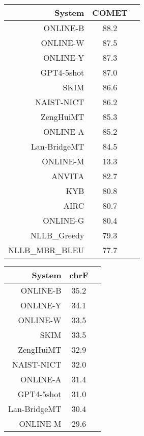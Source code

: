 \documentclass[11pt]{article}
\begin{document}
\begin{table}  
\scriptsize
\begin{subtable}[t]{0.33\textwidth}
\begin{tabular}{rcc}
\toprule 
System  & COMET \\ 
\midrule 
\rowcolor{ashgrey} ONLINE-B  & 88.2 \\ 
\rowcolor{ashgrey} ONLINE-W  & 87.5 \\ 
\rowcolor{ashgrey} ONLINE-Y & 87.3 \\ 
\rowcolor{ashgrey} GPT4-5shot  & 87.0 \\ 
SKIM & 86.6 \\ 
NAIST-NICT  & 86.2 \\ 
\rowcolor{ashgrey} ZengHuiMT  & 85.3 \\ 
\rowcolor{ashgrey} ONLINE-A  & 85.2 \\ 
\rowcolor{ashgrey} Lan-BridgeMT  & 84.5 \\ 
\rowcolor{ashgrey} ONLINE-M & 13.3 \\ 
ANVITA  & 82.7 \\ 
\rowcolor{ashgrey} KYB  & 80.8 \\ 
AIRC  & 80.7 \\ 
\rowcolor{ashgrey} ONLINE-G  & 80.4 \\ 
\rowcolor{ashgrey} NLLB\_Greedy  & 79.3 \\ 
\rowcolor{ashgrey} NLLB\_MBR\_BLEU  & 77.7 \\ 
\bottomrule 
\end{tabular} 
\end{subtable}
\begin{subtable}[t]{0.33\textwidth}
\begin{tabular}{rcc}
\toprule 
System  & chrF \\ 
\midrule 
\rowcolor{ashgrey} ONLINE-B  & 35.2 \\ 
\rowcolor{ashgrey} ONLINE-Y  & 34.1 \\ 
\rowcolor{ashgrey} ONLINE-W  & 33.5 \\ 
SKIM &  33.5 \\ 
\rowcolor{ashgrey} ZengHuiMT  & 32.9 \\ 
NAIST-NICT  & 32.0 \\ 
\rowcolor{ashgrey} ONLINE-A  & 31.4 \\ 
\rowcolor{ashgrey} GPT4-5shot  & 31.0 \\ 
\rowcolor{ashgrey} Lan-BridgeMT  & 30.4 \\ 
\rowcolor{ashgrey} ONLINE-M  & 29.6 \\ 

\end{tabular}
\end{subtable}
\end{table}
\end{document}
